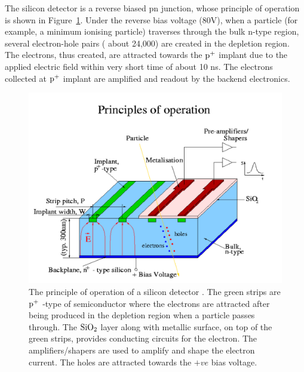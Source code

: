 The silicon detector is a reverse biased \rm{pn} junction, whose principle of operation 
is shown in Figure~\ref{fig:cms_diode}. Under the reverse 
bias voltage (80V), when a particle (for example, a minimum ionising particle) traverses 
through the bulk n-type region, several electron-hole pairs ( about 24,000) are created in 
the depletion region. The electrons, thus created, are attracted towards the $\rm p^+$ 
implant due to the applied electric field within very short time of about 10 ns.
The electrons collected at $\rm p^+$ implant are amplified and readout by the backend electronics.
\begin{figure}
  \begin{center}
	  \includegraphics[width=0.75\linewidth]{Experiment/CMS/Image/Tracker/cms_diode.pdf}
  \caption{The principle of operation of a silicon detector \cite{Diode}. The green
	  strips are $\rm p^+$ -type of semiconductor where the electrons are 
	  attracted after being produced in the depletion region when a particle
	  passes through. The $\rm{SiO}_2$ layer along with metallic surface, on top of 
	  the green strips, provides conducting circuits for the electron. The 
	  amplifiers/shapers are used to amplify and shape the electron current.
	  The holes are attracted towards the $+ve$ bias voltage.}
  \label{fig:cms_diode}
  \end{center}
\end{figure}

